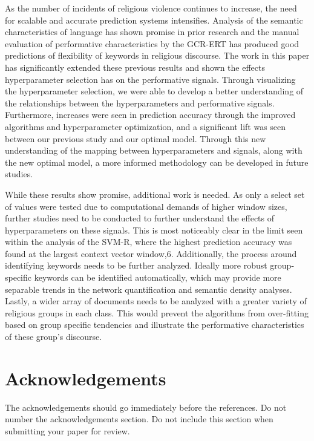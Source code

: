 \documentclass[11pt, a4paper]{article}
\begin{document}
As the number of incidents of religious violence continues to increase, the need for scalable and accurate prediction systems intensifies. Analysis of the semantic characteristics of language has shown promise in prior research and the manual evaluation of performative characteristics by the GCR-ERT has produced good predictions of flexibility of keywords in religious discourse. The work in this paper has significantly extended these previous results and shown the effects hyperparameter selection has on the performative signals. Through visualizing the hyperparameter selection, we were able to develop a better understanding of the relationships between the hyperparameters and performative signals. Furthermore, increases were seen in prediction accuracy through the improved algorithms and hyperparameter optimization, and a significant lift was seen between our previous study and our optimal model. Through this new understanding of the mapping between hyperparameters and signals, along with the new optimal model, a more informed methodology can be developed in future studies. 

While these results show promise, additional work is needed. As only a select set of values were tested due to computational demands of higher window sizes, further studies need to be conducted to further understand the effects of hyperparameters on these signals. This is most noticeably clear in the limit seen within the analysis of the SVM-R, where the highest prediction accuracy was found at the largest context vector window,6. Additionally, the process around identifying keywords needs to be further analyzed. Ideally more robust group-specific keywords can be identified automatically, which may provide more separable trends in the network quantification and semantic density analyses. Lastly, a wider array of documents needs to be analyzed with a greater variety of religious groups in each class. This would prevent the algorithms from over-fitting based on group specific tendencies and illustrate the performative characteristics of these group's discourse.

\section*{Acknowledgements}

The acknowledgements should go immediately before the references.  Do
not number the acknowledgements section. Do not include this section
when submitting your paper for review.

\newpage


\end{document}
